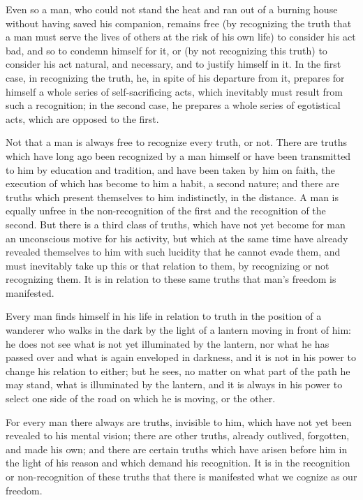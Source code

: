 \documentclass{book}
\begin{document}
Even so a man, who could not stand the heat and ran out of a burning house without having saved his companion, remains free (by recognizing the truth that a man must serve the lives of others at the risk of his own life) to consider his act bad, and so to condemn himself for it, or (by not recognizing this truth) to consider his act natural, and necessary, and to justify himself in it. In the first case, in recognizing the truth, he, in spite of his departure from it, prepares for himself a whole series of self-sacrificing acts, which inevitably must result from such a recognition; in the second case, he prepares a whole series of egotistical acts, which are opposed to the first.

Not that a man is always free to recognize every truth, or not. There are truths which have long ago been recognized by a man himself or have been transmitted to him by education and tradition, and have been taken by him on faith, the execution of which has become to him a habit, a second nature; and there are truths which present themselves to him indistinctly, in the distance. A man is equally unfree in the non-recognition of the first and the recognition of the second. But there is a third class of truths, which have not yet become for man an unconscious motive for his activity, but which at the same time have already revealed themselves to him with such lucidity that he cannot evade them, and must inevitably take up this or that relation to them, by recognizing or not recognizing them. It is in relation to these same truths that man’s freedom is manifested.

Every man finds himself in his life in relation to truth in the position of a wanderer who walks in the dark by the light of a lantern moving in front of him: he does not see what is not yet illuminated by the lantern, nor what he has passed over and what is again enveloped in darkness, and it is not in his power to change his relation to either; but he sees, no matter on what part of the path he may stand, what is illuminated by the lantern, and it is always in his power to select one side of the road on which he is moving, or the other.

For every man there always are truths, invisible to him, which have not yet been revealed to his mental vision; there are other truths, already outlived, forgotten, and made his own; and there are certain truths which have arisen before him in the light of his reason and which demand his recognition. It is in the recognition or non-recognition of these truths that there is manifested what we cognize as our freedom.
\end{document}
